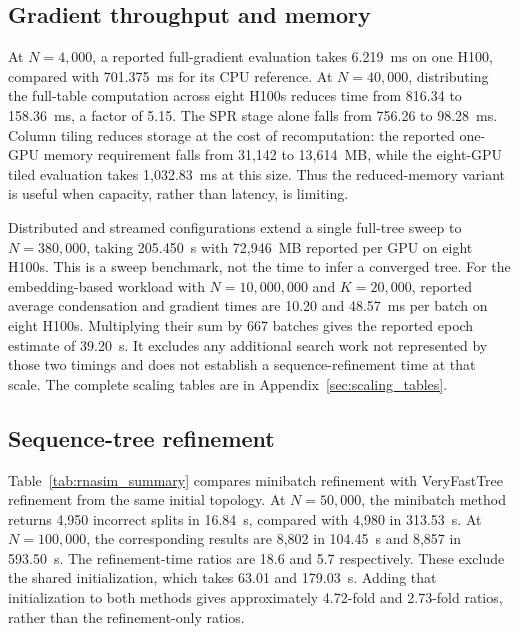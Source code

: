 \documentclass[11pt,a4paper]{article}
\makeatletter
\DeclareRobustCommand{\_}{\ifmmode\nfss@text{\textunderscore}\else\textunderscore\allowbreak\fi}
\theoremstyle{definition}
\makeatother
\begin{document}
\subsection{Gradient throughput and memory}

At $N=4{,}000$, a reported full-gradient evaluation takes 6.219~ms on one H100, compared with 701.375~ms for its CPU reference.
At $N=40{,}000$, distributing the full-table computation across eight H100s reduces time from 816.34 to 158.36~ms, a factor of 5.15.
The SPR stage alone falls from 756.26 to 98.28~ms.
Column tiling reduces storage at the cost of recomputation: the reported one-GPU memory requirement falls from 31,142 to 13,614~MB, while the eight-GPU tiled evaluation takes 1,032.83~ms at this size.
Thus the reduced-memory variant is useful when capacity, rather than latency, is limiting.

Distributed and streamed configurations extend a single full-tree sweep to $N=380{,}000$, taking 205.450~s with 72,946~MB reported per GPU on eight H100s.
This is a sweep benchmark, not the time to infer a converged tree.
For the embedding-based workload with $N=10{,}000{,}000$ and $K=20{,}000$, reported average condensation and gradient times are 10.20 and 48.57~ms per batch on eight H100s.
Multiplying their sum by 667 batches gives the reported epoch estimate of 39.20~s.
It excludes any additional search work not represented by those two timings and does not establish a sequence-refinement time at that scale.
The complete scaling tables are in Appendix~\ref{sec:scaling_tables}.

\subsection{Sequence-tree refinement}

Table~\ref{tab:rnasim_summary} compares minibatch refinement with VeryFastTree refinement from the same initial topology.
At $N=50{,}000$, the minibatch method returns 4,950 incorrect splits in 16.84~s, compared with 4,980 in 313.53~s.
At $N=100{,}000$, the corresponding results are 8,802 in 104.45~s and 8,857 in 593.50~s.
The refinement-time ratios are 18.6 and 5.7 respectively.
These exclude the shared initialization, which takes 63.01 and 179.03~s.
Adding that initialization to both methods gives approximately 4.72-fold and 2.73-fold ratios, rather than the refinement-only ratios.
\end{document}
